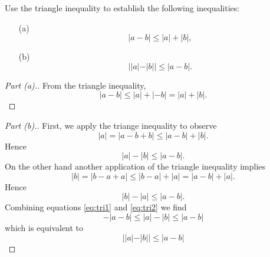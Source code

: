 \documentclass[12pt]{article}
\makeatletter
\theoremstyle{homework}
\newenvironment{exercise}[1]
{\def\@currentlabel{#1}\exercisecore}
{\endexercisecore}
\makeatother
\begin{document}
\begin{exercise}{1.2.5}
Use the triangle inequality to establish the following inequalities:
\begin{enumerate}
\item[(a)]
\[
|a-b| \le |a| + |b|,
\]
\item[(b)] 
\[
||a|-|b|| \le |a-b|.
\]
\end{enumerate}
\end{exercise}
\begin{proof}[Part (a).]
From the triangle inequality,
\[
|a-b| \le |a| + |-b| = |a| + |b|.
\]
\end{proof}
\begin{proof}[Part (b).]
First, we apply the triange inequality to observe
\[
|a| = |a-b + b| \le |a-b| + |b|.
\]
Hence
\begin{equation}\label{eq:tri1}
|a|-|b| \le |a-b|.
\end{equation}
On the other hand another application of the triangle inequality implies
\[
|b| = |b-a + a| \le |b-a| + |a| = |a-b| + |a|.
\]
Hence
\begin{equation}\label{eq:tri2}
|b| - |a| \le |a-b|.
\end{equation}
Combining equations \eqref{eq:tri1} and \eqref{eq:tri2} we find
\[
-|a-b| \le |a|-|b| \le |a-b|
\]
which is equivalent to
\[
||a|-|b|| \le |a-b|
\]
\end{proof}
\end{document}
